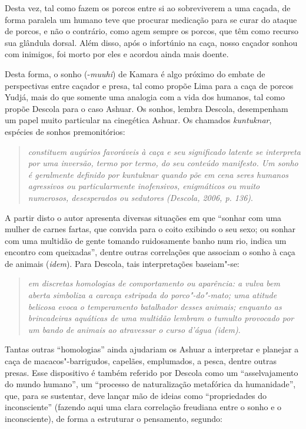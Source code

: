 Desta vez, tal como fazem os porcos entre si ao sobreviverem a uma
caçada, de forma paralela um humano teve que procurar medicação para se
curar do ataque de porcos, e não o contrário, como agem sempre os
porcos, que têm como recurso sua glândula dorsal. Além disso, após o
infortúnio na caça, nosso caçador sonhou com inimigos, foi morto por
eles e acordou ainda mais doente.

Desta forma, o sonho (-\emph{muuhi}) de Kamara é algo próximo do embate
de perspectivas entre caçador e presa, tal como propõe Lima para a caça
de porcos Yudjá, mais do que somente uma analogia com a vida dos
humanos, tal como propõe Descola para o caso Ashuar. Os sonhos, lembra
Descola, desempenham um papel muito particular na cinegética Ashuar. Os
chamados \emph{kuntuknar}, espécies de sonhos premonitórios:

\begin{quote}
\emph{constituem augúrios favoráveis à caça e seu significado latente se
interpreta por uma inversão, termo por termo, do seu conteúdo manifesto.
Um sonho é geralmente definido por \emph{kuntuknar} quando põe em cena
seres humanos agressivos ou particularmente inofensivos, enigmáticos ou
muito numerosos, desesperados ou sedutores (Descola, 2006, p. 136)}.
\end{quote}

A partir disto o autor apresenta diversas situações em que ``sonhar com
uma mulher de carnes fartas, que convida para o coito exibindo o seu
sexo; ou sonhar com uma multidão de gente tomando ruidosamente banho num
rio, indica um encontro com queixadas'', dentre outras correlações que
associam o sonho à caça de animais (\emph{idem}). Para Descola, tais
interpretações baseiam"-se:

\begin{quote}
\emph{em discretas homologias de comportamento ou aparência: a vulva bem
aberta simboliza a carcaça estripada do porco"-do"-mato; uma atitude
belicosa evoca o temperamento batalhador desses animais; enquanto as
brincadeiras aquáticas de uma multidão lembram o tumulto provocado por
um bando de animais ao atravessar o curso d'água (\emph{idem})}.
\end{quote}

Tantas outras ``homologias'' ainda ajudariam os Ashuar a interpretar e
planejar a caça de macacos"-barrigudos, capelães, emplumados, a pesca,
dentre outras presas. Esse dispositivo é também referido por Descola
como um ``asselvajamento do mundo humano'', um ``processo de naturalização
metafórica da humanidade'', que, para se sustentar, deve lançar mão de
ideias como ``propriedades do inconsciente'' (fazendo aqui uma clara
correlação freudiana entre o sonho e o inconsciente), de forma a
estruturar o pensamento, segundo:

